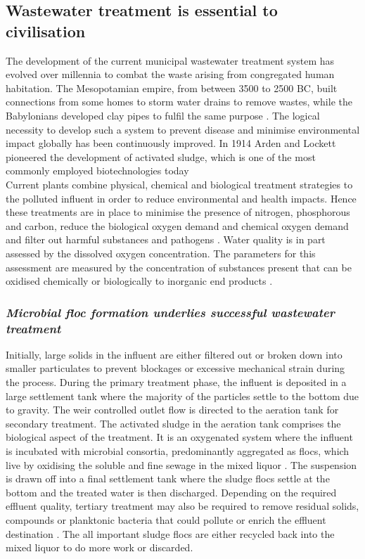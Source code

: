 \documentclass[11pt]{article}
\begin{document}
\subsection{Wastewater treatment is essential to civilisation}
The development of the current municipal wastewater treatment system has evolved over millennia to combat the waste arising from congregated human habitation. The Mesopotamian empire, from between 3500 to 2500 BC, built connections from some homes to storm water drains to remove wastes, while the Babylonians developed clay pipes to fulfil the same purpose \cite{lofrano2010}. The logical necessity to develop such a system to prevent disease and minimise environmental impact globally has been continuously improved. In 1914 Arden and Lockett pioneered the development of activated sludge, which is one of the most commonly employed biotechnologies today \cite{jenkins2004manual,muchie2010bioremediation}\\


Current plants combine physical, chemical and biological treatment strategies to the polluted influent in order to reduce environmental and health impacts. Hence these treatments are in place to minimise the presence of nitrogen, phosphorous and carbon, reduce the biological oxygen demand and chemical oxygen demand and filter out harmful substances and pathogens \cite{mayhew1997low}.
Water quality is in part assessed by the dissolved oxygen concentration. The parameters for this assessment are measured by the concentration of substances present that can be oxidised chemically or biologically to inorganic end products \cite{pisarevsky2005chemical}.

\subsubsection{\emph{Microbial floc formation underlies successful wastewater treatment}}
Initially, large solids in the influent are either filtered out or broken down into smaller particulates to prevent blockages or excessive mechanical strain during the process. During the primary treatment phase, the influent is deposited in a large settlement tank where the majority of the particles settle to the bottom due to gravity. The weir controlled outlet flow is directed to the aeration tank for secondary treatment. The activated sludge in the aeration tank comprises the biological aspect of the treatment. It is an oxygenated system where the influent is incubated with microbial consortia, predominantly aggregated as flocs, which live by oxidising the soluble and fine sewage in the mixed liquor \cite{mayhew1997low}. The suspension is drawn off into a final settlement tank where the sludge flocs settle at the bottom and the treated water is then discharged. Depending on the required effluent quality, tertiary treatment may also be required to remove residual solids, compounds or planktonic bacteria that could pollute or enrich the effluent destination \cite{Price_95}. The all important sludge flocs are either recycled back into the mixed liquor to do more work or discarded.\\
\end{document}
